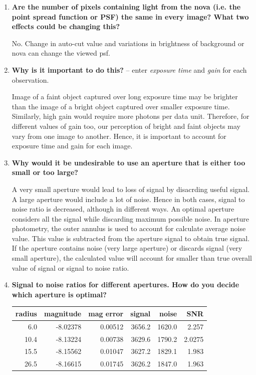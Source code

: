 \documentclass{article}
\begin{document}
\begin{enumerate}
		\item \textbf{Are the number of pixels containing light from the nova (i.e. the point spread function or PSF) the
			same in every image? What two effects could be changing this?}
		
		No. Change in auto-cut value and variations in brightness of background or nova can change the viewed psf.
		
		\item \textbf{Why is it important to do this?} -- enter \emph{exposure time} and \emph{gain} for each observation.
		
		Image of a faint object captured over long exposure time may be brighter than the image of a bright object captured over smaller exposure time. Similarly, high gain would require more photons per data unit. Therefore, for different values of gain too, our perception of bright and faint objects may vary from one image to another. Hence, it is important to account for exposure time and gain for each image.
		
		\item \textbf{Why would it be undesirable to use an aperture that is either too small or too large?}
		
		A very small aperture would lead to loss of signal by disacrding useful signal. A large aperture would include a lot of noise. Hence in both cases, signal to noise ratio is decreased, although in different ways. An optimal aperture considers all the signal while discarding maximum possible noise. In aperture photometry, the outer annulus is used to account for calculate average noise value. This value is subtracted from the aperture signal to obtain true signal. If the aperture contains noise (very large aperture) or discards signal (very small aperture), the calculated value will account for smaller than true overall value of signal or signal to noise ratio. 
		
		\item \textbf{Signal to noise ratios for different apertures. How do you decide which aperture is optimal?}
		
		\begin{table} [h]
			\centering
			\begin{tabular} {r r r r r r}
				\toprule
				\textbf{radius} & \textbf{magnitude} &\textbf{mag error} & \textbf{signal} & \textbf{noise} &\textbf{SNR} \\
				\midrule
				6.0 & -8.02378 & 0.00512 & 3656.2 & 1620.0 & 2.257 \\
				10.4 & -8.13224 & 0.00738 & 3629.6 & 1790.2 & 2.0275 \\
				15.5 & -8.15562 & 0.01047 & 3627.2 & 1829.1 & 1.983 \\
				26.5 & -8.16615 & 0.01745 & 3626.2 & 1847.0 & 1.963 \\
				\bottomrule
			\end{tabular}
		\end{table}
		

\end{enumerate}
\end{document}
